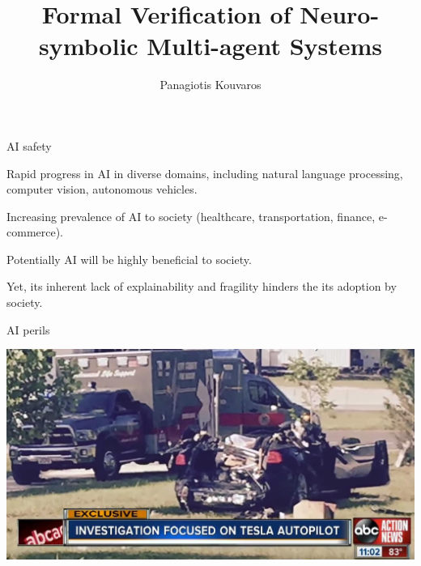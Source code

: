 \documentclass[10pt]{beamer}
\begin{document}
\title{Formal Verification of Neuro-symbolic Multi-agent Systems}
\author{ Panagiotis Kouvaros} 
\date{}


\begin{frame}
  	\maketitle
\end{frame}


\begin{frame}{AI safety}

	Rapid progress in AI in diverse domains, including natural
	language processing, computer vision, autonomous vehicles.

	\vspace{2em}

	Increasing prevalence of AI to society (healthcare,
	transportation, finance, e-commerce).


	\vspace{2em}

	Potentially AI will be \alert{highly beneficial} to society.


	\vspace{2em}

	Yet, its inherent \alert{lack of explainability} and
	\alert{fragility} hinders the its adoption by society.
\end{frame}	
	

\begin{frame}{AI perils}

\begin{center}
	\includegraphics[width=\textwidth]{tesla.png}
\end{center}

\end{frame}
\end{document}
